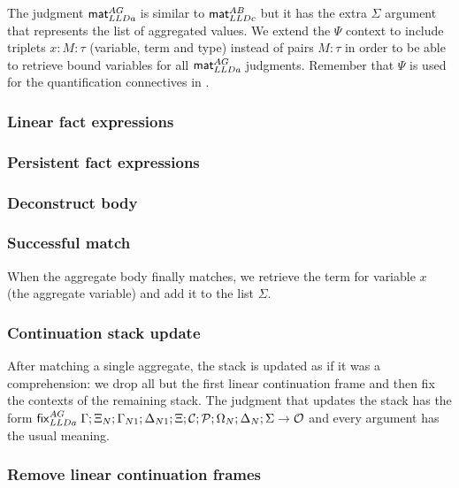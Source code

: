 The judgment $\mathsf{mat}_{LLDa}^{AG} \;$is similar to $\mathsf{mat}_{LLDc}^{AB} \;$but it has the extra $\Sigma$ argument that
represents the list of aggregated values. We extend the $\Psi$ context to
include triplets $x : M : \tau$ (variable, term and type) instead of pairs $M :
\tau$ in order to be able to retrieve bound variables for all $\mathsf{mat}_{LLDa}^{AG} \;$judgments.
Remember that $\Psi$ is used for the quantification connectives in \fragment.

\subsubsection{Linear fact expressions}



\subsubsection{Persistent fact expressions}



\subsubsection{Deconstruct body}



\subsubsection{Successful match}

When the aggregate body finally matches, we retrieve the term for variable $x$
(the aggregate variable) and add it to the list $\Sigma$.



\subsubsection{Continuation stack update}

After matching a single aggregate, the stack is updated as if it was a
comprehension: we drop all but the first linear continuation frame and then fix
the contexts of the remaining stack.  The judgment that updates the stack has
the form $\mathsf{fix}_{LLDa}^{AG} \; \Gamma; \Xi_N; \Gamma_{N1}; \Delta_{N1}; \Xi; \mathcal{C};
\mathcal{P}; \Omega_N; \Delta_N; \Sigma \rightarrow \mathcal{O}$ and every argument
has the usual meaning.

\subsubsection{Remove linear continuation frames}

